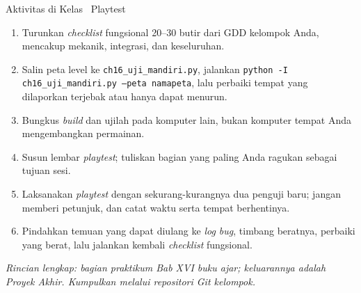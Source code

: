 \documentclass[aspectratio=169,10pt]{beamer}
\begin{document}
\begin{frame}{Aktivitas di Kelas \textperiodcentered\ Playtest}
\begin{enumerate}
  \item Turunkan \emph{checklist} fungsional 20--30 butir dari GDD kelompok
        Anda, mencakup mekanik, integrasi, dan keseluruhan.
  \item Salin peta level ke \texttt{ch16\_uji\_mandiri.py}, jalankan
        \texttt{python -I ch16\_uji\_mandiri.py --peta namapeta}, lalu perbaiki
        tempat yang dilaporkan terjebak atau hanya dapat menurun.
  \item Bungkus \emph{build} dan ujilah pada komputer lain, bukan komputer
        tempat Anda mengembangkan permainan.
  \item Susun lembar \emph{playtest}; tuliskan bagian yang paling Anda ragukan
        sebagai tujuan sesi.
  \item Laksanakan \emph{playtest} dengan sekurang-kurangnya dua penguji baru;
        jangan memberi petunjuk, dan catat waktu serta tempat berhentinya.
  \item Pindahkan temuan yang dapat diulang ke \emph{log bug}, timbang beratnya,
        perbaiki yang berat, lalu jalankan kembali \emph{checklist} fungsional.
\end{enumerate}
\vspace{0.06cm}
{\footnotesize\color{ubAccent}\itshape Rincian lengkap: bagian praktikum Bab XVI
buku ajar; keluarannya adalah Proyek Akhir. Kumpulkan melalui repositori Git
kelompok.}
\end{frame}
\end{document}
